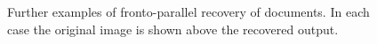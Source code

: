 \begin{figure}[t]
\begin{center}

\end{center}
\caption{Further examples of fronto-parallel recovery of documents. In each case the original image is shown above the recovered output.}
\label{evenmoreppresults}
\end{figure}

